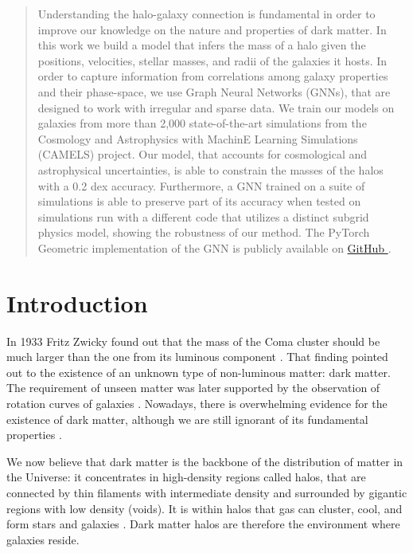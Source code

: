 \documentclass[twocolumn]{aastex631}
\begin{document}
\begin{abstract}
Understanding the halo-galaxy connection is fundamental in order to improve our knowledge on the nature and properties of dark matter. In this work we build a model that infers the mass of a halo given the positions, velocities, stellar masses, and radii of the galaxies it hosts. In order to capture information from correlations among galaxy properties and their phase-space, we use Graph Neural Networks (GNNs), that are designed to work with irregular and sparse data. We train our models on galaxies from more than 2,000 state-of-the-art simulations from the Cosmology and Astrophysics with MachinE Learning Simulations (CAMELS) project. Our model, that accounts for cosmological and astrophysical uncertainties, is able to constrain the masses of the halos with a 0.2 dex accuracy. Furthermore, a GNN trained on a suite of simulations is able to preserve part of its accuracy when tested on simulations run with a different code that utilizes a distinct subgrid physics model, showing the robustness of our method. The PyTorch Geometric implementation of the GNN is publicly available on \href{https://github.com/PabloVD/HaloGraphNet}{GitHub }.
\end{abstract}




\section{Introduction}


In 1933 Fritz Zwicky found out that the mass of the Coma cluster should be much larger than the one from its luminous component \citep{1933AcHPh...6..110Z}. That finding pointed out to the existence of an unknown type of non-luminous matter: dark matter. The requirement of unseen matter was later supported by the observation of rotation curves of galaxies \citep{1978ApJ...225L.107R, 1978PhDT.......195B}. Nowadays, there is overwhelming evidence for the existence of dark matter, although we are still ignorant of its fundamental properties \citep{2017FrPhy..12l1201Y}.

We now believe that dark matter is the backbone of the distribution of matter in the Universe: it concentrates in high-density regions called halos, that are connected by thin filaments with intermediate density and surrounded by gigantic regions with low density (voids). It is within halos that gas can cluster, cool, and form stars and galaxies \citep{2015ARA&A..53...51S}. Dark matter halos are therefore the environment where galaxies reside.
\end{document}

